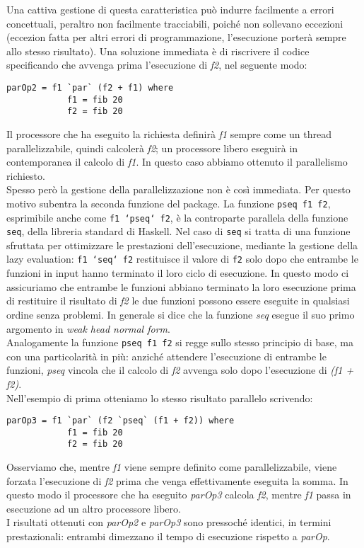 Una cattiva gestione di questa caratteristica può indurre facilmente a errori concettuali, peraltro non facilmente tracciabili, poiché non sollevano eccezioni (eccezion fatta per altri errori di programmazione, l'esecuzione porterà sempre allo stesso risultato). Una soluzione immediata è di riscrivere il codice specificando che avvenga prima l'esecuzione di \textit{f2}, nel seguente modo:
\begin{verbatim}
parOp2 = f1 `par` (f2 + f1) where
            f1 = fib 20
            f2 = fib 20
\end{verbatim}
Il processore che ha eseguito la richiesta definirà \textit{f1} sempre come un thread parallelizzabile, quindi calcolerà \textit{f2}; un processore libero eseguirà in contemporanea il calcolo di \textit{f1}. In questo caso abbiamo ottenuto il parallelismo richiesto.\\
Spesso però la gestione della parallelizzazione non è così immediata. Per questo motivo subentra la seconda funzione del package. La funzione \texttt{pseq f1 f2}, esprimibile anche come \texttt{f1 `pseq` f2}, è la controparte parallela della funzione \texttt{seq}, della libreria standard di Haskell. Nel caso di \texttt{seq} si tratta di una funzione sfruttata per ottimizzare le prestazioni dell'esecuzione, mediante la gestione della lazy evaluation: \texttt{f1 `seq` f2} restituisce il valore di \texttt{f2} solo dopo che entrambe le funzioni in input hanno terminato il loro ciclo di esecuzione. In questo modo ci assicuriamo che entrambe le funzioni abbiano terminato la loro esecuzione prima di restituire il risultato di \textit{f2} le due funzioni possono essere eseguite in qualsiasi ordine senza problemi. In generale si dice che la funzione \textit{seq} esegue il suo primo argomento in \textit{weak head normal form}.\\
Analogamente la funzione \texttt{pseq f1 f2} si regge sullo stesso principio di base, ma con una particolarità in più: anziché attendere l'esecuzione di entrambe le funzioni, \textit{pseq} vincola che il calcolo di \textit{f2} avvenga solo dopo l'esecuzione di \textit{(f1 + f2)}.\\
Nell'esempio di prima otteniamo lo stesso risultato parallelo scrivendo:
\begin{verbatim}
parOp3 = f1 `par` (f2 `pseq` (f1 + f2)) where
            f1 = fib 20
            f2 = fib 20
\end{verbatim}
Osserviamo che, mentre \textit{f1} viene sempre definito come parallelizzabile, viene forzata l'esecuzione di \textit{f2} prima che venga effettivamente eseguita la somma. In questo modo il processore che ha eseguito \textit{parOp3} calcola \textit{f2}, mentre \textit{f1} passa in esecuzione ad un altro processore libero.\\
I risultati ottenuti con \textit{parOp2} e \textit{parOp3} sono pressoché identici, in termini prestazionali: entrambi dimezzano il tempo di esecuzione rispetto a \textit{parOp}.
